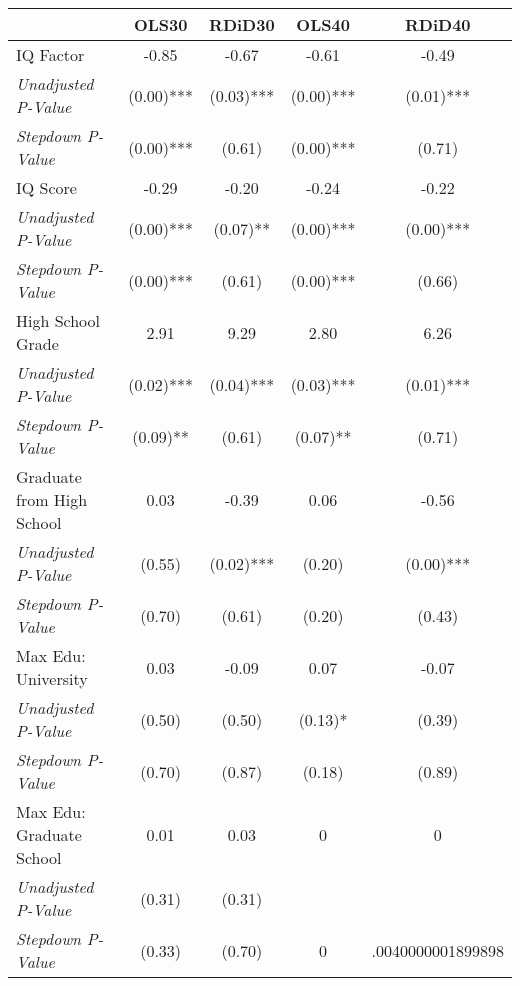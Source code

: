 \begin{tabular}{l c c c c}
\toprule
 & OLS30 & RDiD30 & OLS40 & RDiD40 \\
\midrule
IQ Factor & -0.85 & -0.67 & -0.61 & -0.49 \\
\quad \textit{Unadjusted P-Value} & (0.00)*** & (0.03)*** & (0.00)*** & (0.01)*** \\
\quad \textit{Stepdown P-Value} & (0.00)*** & (0.61) & (0.00)*** & (0.71) \\
IQ Score & -0.29 & -0.20 & -0.24 & -0.22 \\
\quad \textit{Unadjusted P-Value} & (0.00)*** & (0.07)** & (0.00)*** & (0.00)*** \\
\quad \textit{Stepdown P-Value} & (0.00)*** & (0.61) & (0.00)*** & (0.66) \\
High School Grade & 2.91 & 9.29 & 2.80 & 6.26 \\
\quad \textit{Unadjusted P-Value} & (0.02)*** & (0.04)*** & (0.03)*** & (0.01)*** \\
\quad \textit{Stepdown P-Value} & (0.09)** & (0.61) & (0.07)** & (0.71) \\
Graduate from High School & 0.03 & -0.39 & 0.06 & -0.56 \\
\quad \textit{Unadjusted P-Value} & (0.55) & (0.02)*** & (0.20) & (0.00)*** \\
\quad \textit{Stepdown P-Value} & (0.70) & (0.61) & (0.20) & (0.43) \\
Max Edu: University & 0.03 & -0.09 & 0.07 & -0.07 \\
\quad \textit{Unadjusted P-Value} & (0.50) & (0.50) & (0.13)* & (0.39) \\
\quad \textit{Stepdown P-Value} & (0.70) & (0.87) & (0.18) & (0.89) \\
Max Edu: Graduate School & 0.01 & 0.03 & 0 & 0 \\
\quad \textit{Unadjusted P-Value} & (0.31) & (0.31) & & \\
\quad \textit{Stepdown P-Value} & (0.33) & (0.70) & 0 & .0040000001899898 \\
\bottomrule
\end{tabular}
